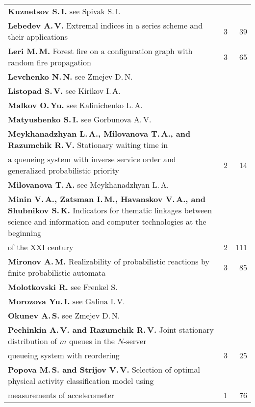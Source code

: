 {\begin{tabular}{p{397pt}rr}
\textbf{Kuznetsov S.\,I.} see Spivak S.\,I.&&\\
\textbf{Lebedev A.\,V.} Extremal indices in a series scheme and their
applications&3&39\\
\textbf{Leri M.\,M.} Forest fire on a configuration graph with random fire
propagation&3&65\\
\textbf{Levchenko N.\,N.} see Zmejev D.\,N.&&\\
\textbf{Listopad S.\,V.} see Kirikov I.\,А.&&\\
\textbf{Malkov O.\,Yu.} see Kalinichenko L.\,A.&&\\
\textbf{Matyushenko S.\,I.} see Gorbunova A.\,V.&&\\
\textbf{Meykhanadzhyan L.\,A., Milovanova T.\,A., and Razumchik R.\,V.}
Stationary waiting time in\linebreak
\\[-12pt]
\hspace*{21pt}a queueing system with inverse service order and
generalized probabilistic priority&2&14\\
\textbf{Milovanova T.\,A.} see Meykhanadzhyan L.\,A.&&\\
\hangindent=21pt\noindent\textbf{Minin V.\,A., Zatsman I.\,M., Havanskov V.\,A.,
and Shubnikov S.\,K.} Indicators for thematic linkages between science
and information and
computer technologies at the beginning\linebreak
\\[-12pt]
\hspace*{21pt}of the XXI century&2&111\\
\textbf{Mironov A.\,M.} Realizability of probabilistic reactions by finite
probabilistic automata&3&85\\
\textbf{Molotkovski R.} see Frenkel S.&&\\
\textbf{Morozova Yu.\,I.} see Galina I.\,V.&&\\
\textbf{Okunev A.\,S.} see Zmejev D.\,N.&&\\
\textbf{Pechinkin A.\,V. and Razumchik R.\,V.} Joint stationary distribution of
$m$ queues in the $N$-server\linebreak
\\[-12pt]
\hspace*{21pt}queueing system with reordering&3&25\\
\textbf{Popova M.\,S. and Strijov V.\,V.} Selection of optimal physical activity
classification model using\linebreak
\\[-12pt]
\hspace*{21pt}measurements of accelerometer&1&76\\

\end{tabular}}
